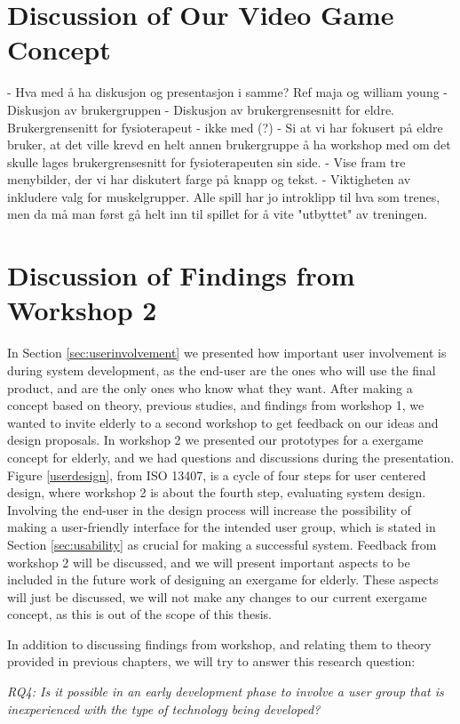 \section{Discussion of Our Video Game Concept}
- Hva med å ha diskusjon og presentasjon i samme? Ref maja og william young
- Diskusjon av brukergruppen
- Diskusjon av brukergrensesnitt for eldre. Brukergrensenitt for fysioterapeut - ikke med (?)
- Si at vi har fokusert på eldre bruker, at det ville krevd en helt annen brukergruppe å ha workshop med om det skulle lages brukergrensesnitt for fysioterapeuten sin side.
- Vise fram tre menybilder, der vi har diskutert farge på knapp og tekst. 
- Viktigheten av inkludere valg for muskelgrupper. Alle spill har jo introklipp til hva som trenes, men da må man først gå helt inn til spillet for å vite "utbyttet" av treningen.

\section{Discussion of Findings from Workshop 2}
In Section \ref{sec:userinvolvement} we presented how important user involvement is during system development, as the end-user are the ones who will use the final product, and are the only ones who know what they want. After making a concept based on theory, previous studies, and findings from workshop 1, we wanted to invite elderly to a second workshop to get feedback on our ideas and design proposals. In workshop 2 we presented our prototypes for a exergame concept for elderly, and we had questions and discussions during the presentation. Figure \ref{userdesign}, from ISO 13407, is a cycle of four steps for user centered design, where workshop 2 is about the fourth step, evaluating system design. Involving the end-user in the design process will increase the possibility of making a user-friendly interface for the intended user group, which is stated in Section \ref{sec:usability} as crucial for making a successful system. Feedback from workshop 2 will be discussed, and we will present important aspects to be included in the future work of designing an exergame for elderly. These aspects will just be discussed, we will not make any changes to our current exergame concept, as this is out of the scope of this thesis.

In addition to discussing findings from workshop, and relating them to theory provided in previous chapters, we will try to answer this research question:
 
\emph{RQ4: Is it possible in an early development phase to involve a user group that is inexperienced with the type of technology being developed?}

